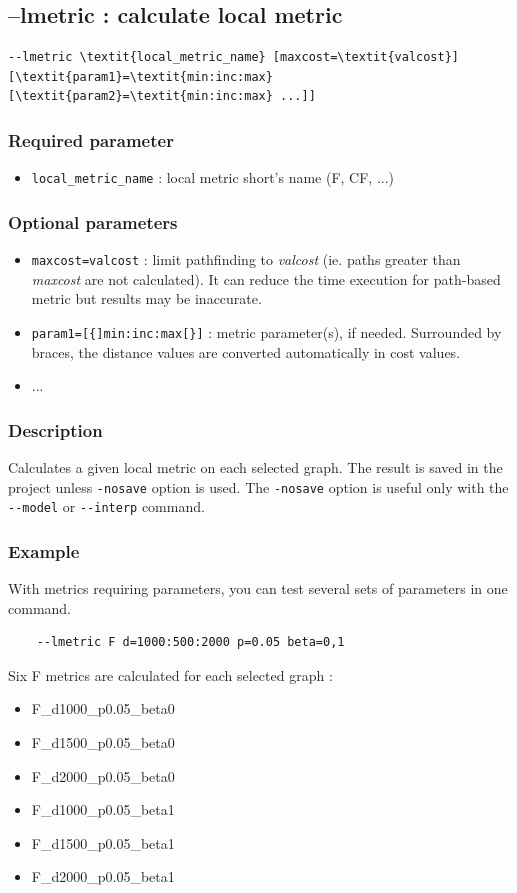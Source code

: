 \documentclass[a4paper,10pt]{report}
\begin{document}
\subsection{--lmetric : calculate local metric}
\begin{Verbatim}[commandchars=\\\{\}]
--lmetric \textit{local_metric_name} [maxcost=\textit{valcost}] [\textit{param1}=\textit{min:inc:max} [\textit{param2}=\textit{min:inc:max} ...]] 
\end{Verbatim}

\subsubsection{Required parameter}
\begin{itemize}
	\item \verb|local_metric_name| : local metric short's name (F, CF, ...)
\end{itemize}

\subsubsection{Optional parameters}
\begin{itemize}
	\item \verb|maxcost=valcost| : limit pathfinding to \textit{valcost} (ie. paths greater than \textit{maxcost} are not calculated). It can reduce the time execution for path-based metric but results may be inaccurate.
	\item \verb|param1=[{]min:inc:max[}]| : metric parameter(s), if needed. Surrounded by braces, the distance values are converted automatically in cost values.
	\item ...
\end{itemize}

\subsubsection{Description}
Calculates a given local metric on each selected graph.
The result is saved in the project unless \verb|-nosave| option is used. The \verb|-nosave| option is useful only with the \verb|--model| or \verb|--interp| command.

\subsubsection{Example}
With metrics requiring parameters, you can test several sets of parameters in one command.
\begin{Verbatim}
	--lmetric F d=1000:500:2000 p=0.05 beta=0,1
\end{Verbatim}
Six F metrics are calculated for each selected graph :
\begin{itemize}
 \item F\_d1000\_p0.05\_beta0
 \item F\_d1500\_p0.05\_beta0
 \item F\_d2000\_p0.05\_beta0
 \item F\_d1000\_p0.05\_beta1
 \item F\_d1500\_p0.05\_beta1
 \item F\_d2000\_p0.05\_beta1
\end{itemize}
\end{document}
